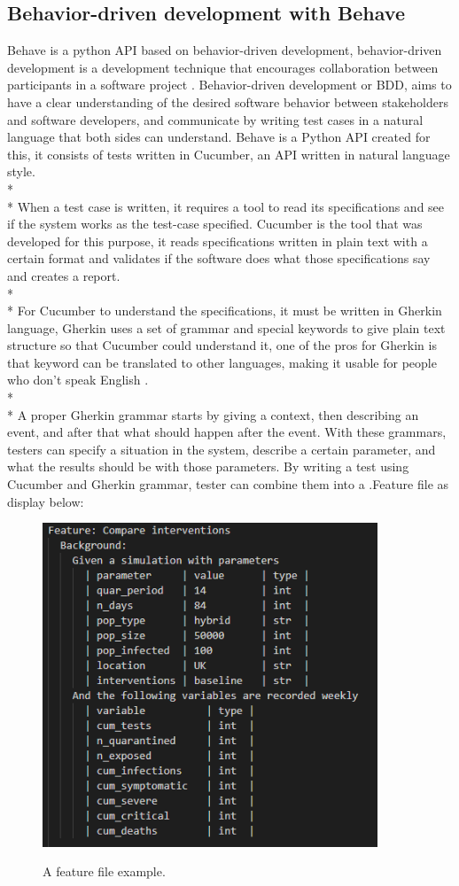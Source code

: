 \subsection{Behavior-driven development with Behave}
Behave is a python API based on behavior-driven development, behavior-driven development is a development technique that encourages collaboration between participants in a software project \cite{Reference8}. Behavior-driven development or BDD, aims to have a clear understanding of the desired software behavior between stakeholders and software developers, and communicate by writing test cases in a natural language that both sides can understand. Behave is a Python API created for this, it consists of tests written in Cucumber, an API written in natural language style. \\*\\*
When a test case is written, it requires a tool to read its specifications and see if the system works as the test-case specified. Cucumber is the tool that was developed for this purpose, it reads specifications written in plain text with a certain format and validates if the software does what those specifications say \cite{Reference9} and creates a report. \\*\\*
For Cucumber to understand the specifications, it must be written in Gherkin language, Gherkin uses a set of grammar and special keywords to give plain text structure so that Cucumber could understand it, one of the pros for Gherkin is that keyword can be translated to other languages, making it usable for people who don’t speak English \cite{Reference10}. \\*\\*
A proper Gherkin grammar starts by giving a context, then describing an event, and after that what should happen after the event. With these grammars, testers can specify a situation in the system, describe a certain parameter, and what the results should be with those parameters. By writing a test using Cucumber and Gherkin grammar, tester can combine them into a .Feature file as display below: 
\begin{figure}[h]
	\centering
	\includegraphics[width=10cm]{figures/featureFile.png}\\
	\caption{A feature file example.}
	\label{fig:figure1}
\end{figure}
